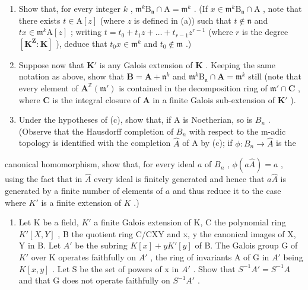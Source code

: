 \begin{enumerate}
\def\labelenumi{(\alph{enumi})}
\setcounter{enumi}{1}
\item
  Show that, for every integer \(k\) , \(\mathfrak{m}^k\mathrm{B}_{\mathfrak{n}} \cap \mathrm{A} = \mathfrak{m}^k\) . (If \(x \in \mathfrak{m}^k\mathrm{B}_{\mathfrak{n}} \cap \mathrm{A}\) , note that there exists \(t \in \mathrm{A}[z]\) (where \(z\) is defined in (a)) such that \(t \notin \mathfrak{n}\) and \(tx \in \mathfrak{m}^k\mathrm{A}[z]\) ; writing \(t = t_0 + t_1z + \dots + t_{r-1}z^{r-1}\) (where \(r\) is the degree \([\mathbf{K}^{\mathbf{Z}}: \mathbf{K}]\) ), deduce that \(t_0x \in \mathfrak{m}^k\) and \(t_0 \notin \mathfrak{m}\) .)
\item
  Suppose now that \(\mathbf{K}'\) is any Galois extension of \(\mathbf{K}\) . Keeping the same notation as above, show that \(\mathbf{B} = \mathbf{A} + \mathfrak{n}^k\) and \(\mathfrak{m}^k\mathrm{B}_{\mathfrak{n}} \cap \mathbf{A} = \mathfrak{m}^k\) still (note that every element of \(\mathbf{A}^{\mathbb{Z}}(\mathfrak{m}')\) is contained in the decomposition ring of \(\mathfrak{m}' \cap \mathbf{C}\) , where \(\mathbf{C}\) is the integral closure of \(\mathbf{A}\) in a finite Galois sub-extension of \(\mathbf{K}'\) ).
\item
  Under the hypotheses of (c), show that, if A is Noetherian, so is \(B_{n}\) . (Observe that the Hausdorff completion of \(B_{n}\) with respect to the m-adic topology is identified with the completion \(\hat{A}\) of A by (c); if \(\phi: B_{n} \rightarrow \hat{A}\) is the
\end{enumerate}

canonical homomorphism, show that, for every ideal \(a\) of \(B_n\) , \(\phi(a\hat{A}) = a\) , using the fact that in \(\hat{A}\) every ideal is finitely generated and hence that \(a\hat{A}\) is generated by a finite number of elements of \(a\) and thus reduce it to the case where \(K'\) is a finite extension of \(K\) .)

\begin{enumerate}
\def\labelenumi{\arabic{enumi}.}
\setcounter{enumi}{11}
\tightlist
\item
  Let K be a field, \(K'\) a finite Galois extension of K, C the polynomial ring \(K'[X, Y]\) , B the quotient ring C/CXY and x, y the canonical images of X, Y in B. Let \(A'\) be the subring \(K[x] + yK'[y]\) of B. The Galois group G of \(K'\) over K operates faithfully on \(A'\) , the ring of invariants A of G in \(A'\) being \(K[x, y]\) . Let S be the set of powers of x in \(A'\) . Show that \(S^{-1}A' = S^{-1}A\) and that G does not operate faithfully on \(S^{-1}A'\) .
\end{enumerate}

